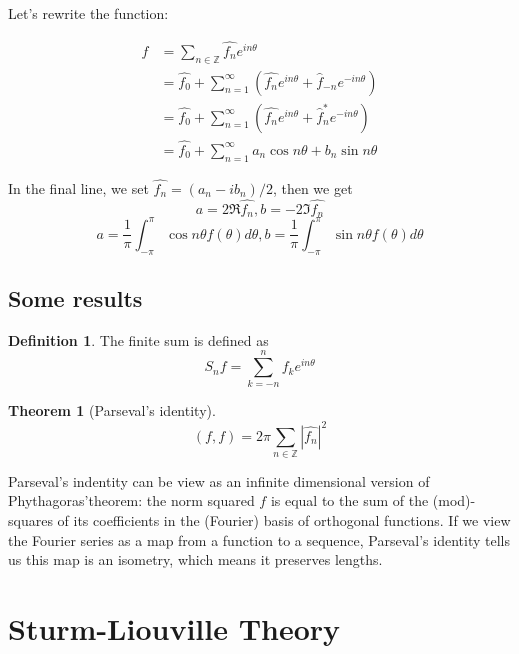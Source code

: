 \documentclass{article}
\theoremstyle{definition}
\newtheorem{definition}{Definition}[section]
\newtheorem{theorem}{Theorem}[section]
\begin{document}
Let's rewrite the function:

\begin{align}
f&=\sum_{n\in \mathbb{Z}}\hat{f_n}e^{in\theta}\\
&=\hat{f_0}+\sum_{n=1}^{\infty}(\hat{f_n}e^{in\theta}+\hat{f}_{-n}e^{-in\theta})\\
&=\hat{f_0}+\sum_{n=1}^{\infty}(\hat{f_n}e^{in\theta}+\hat{f}_{n}^{*}e^{-in\theta})\\
&=\hat{f_0}+\sum_{n=1}^{\infty}a_n\cos{n\theta}+b_n\sin{n\theta}
\end{align}

In the final line, we set $\hat{f_n}=(a_n-ib_n)/2$, then we get
\begin{equation}
a=2 \Re \hat{f_n},b=-2\Im \hat{f_n}
\end{equation}
\begin{equation}
a=\frac{1}{\pi}\int_{-\pi}^{\pi}\cos{n\theta}f(\theta)d\theta, b=\frac{1}{\pi}\int_{-\pi}^{\pi}\sin{n\theta}f(\theta)d\theta
\end{equation}


\subsection{Some results}

\begin{definition}
The finite sum is defined as 
\begin{equation}
S_nf=\sum_{k=-n}^{n}\hat{f_k}e^{in\theta}
\end{equation}
\end{definition}


\begin{theorem}[Parseval's identity]
\begin{equation}
(f,f)=2\pi \sum_{n\in \mathbb{Z}} |\hat{f_n}|^2
\end{equation}
\end{theorem}

Parseval's indentity can be view as an infinite dimensional version of Phythagoras'theorem: the norm squared $f$ is equal to the sum of the (mod)-squares of its coefficients in the (Fourier) basis of orthogonal functions. If we view the Fourier series as a map from a function to a sequence, Parseval's identity tells us this map is an isometry, which means it preserves lengths.

\section{Sturm-Liouville Theory}
\end{document}
